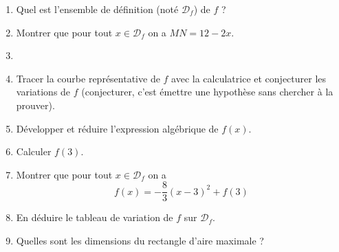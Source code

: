 \documentclass[a4paper,11pt,exos]{nsi} %
\begin{document}
\begin{enumerate}
	\item 	Quel est l'ensemble de définition (noté $\mathcal{D}_f$) de $f$ ?
	\item 	Montrer que pour tout $x\in\mathcal{D}_f$ on a $MN=12-2x$.
	\item 	{}
	\item 	Tracer la courbe représentative de $f$ avec la calculatrice et conjecturer les variations de $f$ 
	(conjecturer, c'est émettre une hypothèse sans chercher à la prouver).
	\item 	Développer et réduire l'expression algébrique de $f(x)$.
	\item 	Calculer $f(3)$.
	\item 	Montrer que pour tout $x\in\mathcal{D}_f$ on a $$f(x)=-\frac{8}{3}(x-3)^2+f(3)$$
	\item 	{} En déduire le tableau de variation de $f$ sur $\mathcal{D}_f$.
	\item 	{} Quelles sont les dimensions du rectangle d'aire maximale ?
\end{enumerate}
\end{document}
